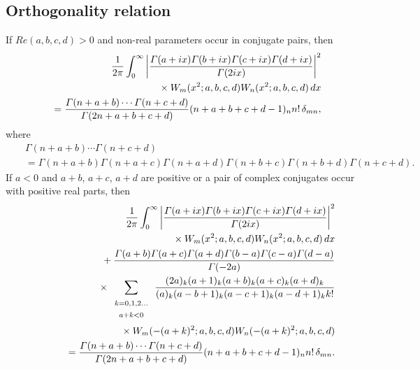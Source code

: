 \documentclass[envcountchap,graybox]{svmono}
\newcommand{\mathindent}{\hspace{7.5mm}}
\renewcommand{\Gamma}{\varGamma}
\begin{document}
\newpage

\subsection*{Orthogonality relation}
If $Re(a,b,c,d)>0$ and non-real parameters occur in conjugate pairs, then
\begin{eqnarray}
\label{OrthIWilson}
& &\frac{1}{2\pi}\int_0^{\infty}
\left|\frac{\Gamma(a+ix)\Gamma(b+ix)\Gamma(c+ix)\Gamma(d+ix)}{\Gamma(2ix)}\right|^2\nonumber\\
& &{}\mathindent\times W_m(x^2;a,b,c,d)W_n(x^2;a,b,c,d)\,dx\nonumber\\
& &{}=\frac{\Gamma(n+a+b)\cdots\Gamma(n+c+d)}{\Gamma(2n+a+b+c+d)}(n+a+b+c+d-1)_nn!\,\delta_{mn},
\end{eqnarray}
where
\begin{eqnarray*}
& &\Gamma(n+a+b)\cdots\Gamma(n+c+d)\\
& &{}=\Gamma(n+a+b)\Gamma(n+a+c)\Gamma(n+a+d)\Gamma(n+b+c)\Gamma(n+b+d)\Gamma(n+c+d).
\end{eqnarray*}
If $a<0$ and $a+b$, $a+c$, $a+d$ are positive or a pair of complex conjugates
occur with positive real parts, then
\begin{eqnarray}
\label{OrtIIWilson}
& &\frac{1}{2\pi}\int_0^{\infty}\left|\frac{\Gamma(a+ix)\Gamma(b+ix)\Gamma(c+ix)\Gamma(d+ix)}{\Gamma(2ix)}\right|^2\nonumber\\
& &{}\mathindent\mathindent\times W_m(x^2;a,b,c,d)W_n(x^2;a,b,c,d)\,dx\nonumber\\
& &{}\mathindent{}+\frac{\Gamma(a+b)\Gamma(a+c)\Gamma(a+d)\Gamma(b-a)\Gamma(c-a)\Gamma(d-a)}{\Gamma(-2a)}\nonumber\\
& &{}\mathindent\mathindent{}\times\sum_{\begin{array}{c}
{\scriptstyle k=0,1,2\ldots}\\{\scriptstyle a+k<0}\end{array}}
\frac{(2a)_k(a+1)_k(a+b)_k(a+c)_k(a+d)_k}{(a)_k(a-b+1)_k(a-c+1)_k(a-d+1)_kk!}\nonumber\\
& &{}\mathindent\mathindent\mathindent\mathindent{}\times W_m(-(a+k)^2;a,b,c,d)W_n(-(a+k)^2;a,b,c,d)\nonumber\\
& &{}=\frac{\Gamma(n+a+b)\cdots\Gamma(n+c+d)}{\Gamma(2n+a+b+c+d)}(n+a+b+c+d-1)_nn!\,\delta_{mn}.
\end{eqnarray}
\end{document}
